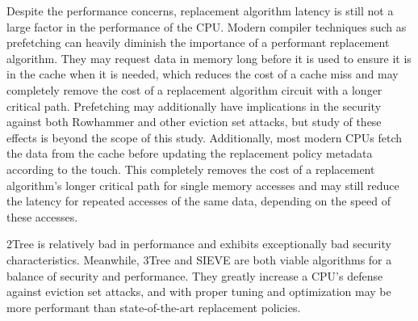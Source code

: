 \documentclass[letterpaper]{article}
\begin{document}
Despite the performance concerns,
replacement algorithm latency is still not a large factor in the performance of the CPU.
Modern compiler techniques such as prefetching can heavily diminish the importance
of a performant replacement algorithm.
They may request data in memory long before it is used to ensure it is in the cache when it is needed,
which reduces the cost of a cache miss
and may completely remove the cost of a replacement algorithm circuit with a longer critical path.
Prefetching may additionally have implications in the security against both Rowhammer
and other eviction set attacks,
but study of these effects is beyond the scope of this study.
Additionally, most modern CPUs fetch the data from the cache before updating the replacement policy metadata
according to the touch.
This completely removes the cost of a replacement algorithm's longer critical path
for single memory accesses
and may still reduce the latency for repeated accesses of the same data,
depending on the speed of these accesses.

2Tree is relatively bad in performance and exhibits exceptionally bad security characteristics.
Meanwhile, 3Tree and SIEVE are both viable algorithms for a balance of security and performance.
They greatly increase a CPU's defense against eviction set attacks,
and with proper tuning and optimization may be more performant than state-of-the-art replacement policies.






\end{document}
